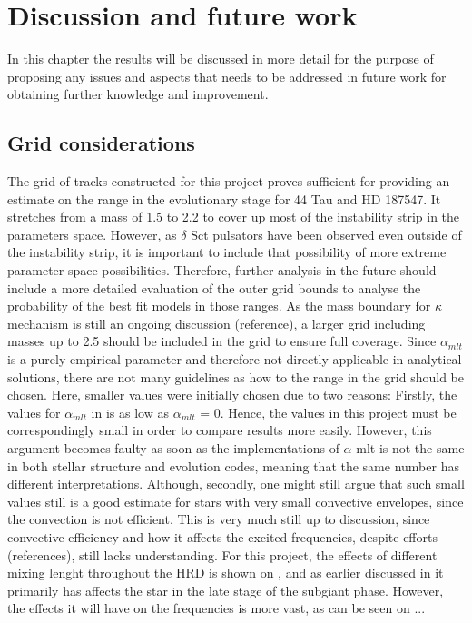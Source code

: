 \chapter{Discussion and future work}
\label{sec:discussion}

In this chapter the results will be discussed in more detail for the purpose of proposing any issues and aspects that needs to be addressed in future work for obtaining further knowledge and improvement. 

\section{Grid considerations}

The grid of tracks constructed for this project proves sufficient for providing an estimate on the range in the evolutionary stage for 44 Tau and HD 187547. It stretches from a mass of 1.5 to 2.2 \msun to cover up most of the instability strip in the parameters space. However, as $\delta$ Sct pulsators have been observed even outside of the instability strip, it is important to include that possibility of more extreme parameter space possibilities. Therefore, further analysis in the future should include a more detailed evaluation of the outer grid bounds to analyse the probability of the best fit models in those ranges. As the mass boundary for $\kappa$ mechanism is still an ongoing discussion (reference), a larger grid including masses up to 2.5 \msun should be included in the grid to ensure full coverage. 
Since $\alpha_{mlt}$ is a purely empirical parameter and therefore not directly applicable in analytical solutions, there are not many guidelines as how to the range in the grid should be chosen. Here, smaller values were initially chosen due to two reasons: Firstly, the values for $\alpha_{mlt}$ in \citep{lenz2010delta} is as low as $\alpha_{mlt}$ = 0. Hence, the values in this project must be correspondingly small in order to compare results more easily. However, this argument becomes faulty as soon as the implementations of $\alpha$ mlt is not the same in both stellar structure and evolution codes, meaning that the same number has different interpretations. Although, secondly, one might still argue that such small values still is a good estimate for stars with very small convective envelopes, since the convection is not efficient. This is very much still up to discussion, since convective efficiency and how it affects the excited frequencies, despite efforts (references), still lacks understanding. For this project, the effects of different mixing lenght throughout the HRD is shown on , and as earlier discussed in  it primarily has affects the star in the late stage of the subgiant phase.  However, the effects it will have on the frequencies is more vast, as can be seen on ...

